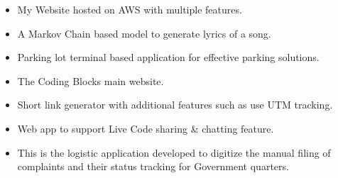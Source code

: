 
\begin{itemize}
\item My Website hosted on AWS with multiple features.
\end{itemize}


\begin{itemize}
\item A Markov Chain based model to generate lyrics of a song. 
\end{itemize}

\begin{itemize}
\item Parking lot terminal based application for effective parking solutions.
\end{itemize}

\begin{itemize}
\item The Coding Blocks main website.
\end{itemize}

\begin{itemize}
\item Short link generator with additional features such as use UTM tracking.
\end{itemize}

\begin{itemize}
\item Web app to support Live Code sharing \& chatting feature.
\end{itemize}


\begin{itemize}
\item This is the logistic application developed to digitize the manual filing of complaints and their status tracking for Government quarters.
\end{itemize}

